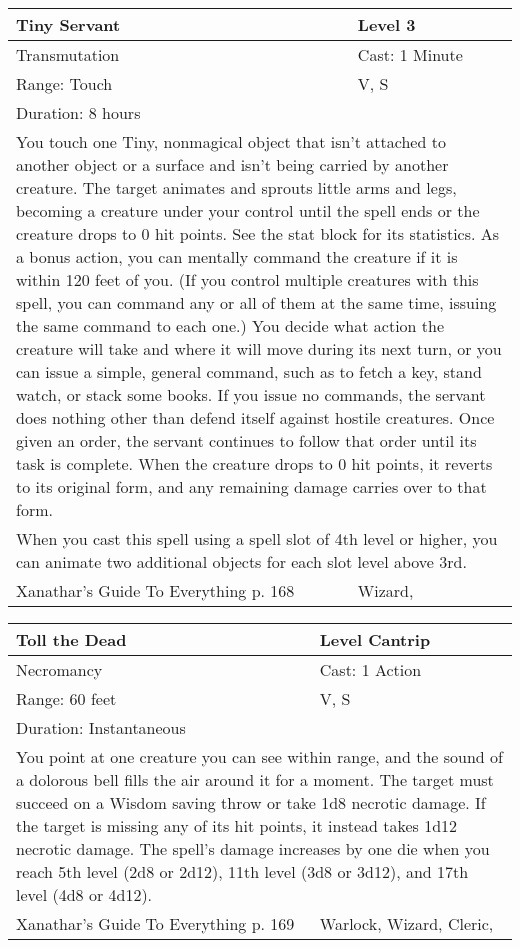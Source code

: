 \documentclass[11pt]{report}
\begin{document}
\begin{table}[H]
	\begin{tabular}{||p{6cm}|p{6cm}||}
		\hline\hline
		\bf{Tiny Servant} & Level 3\\ \hline
		Transmutation & Cast: 1 Minute\\ \hline
		Range: Touch & V, S\\ \hline
		Duration: 8 hours & \\ \hline
		\multicolumn{2}{||p{12cm}||}{You touch one Tiny, nonmagical object that isn’t attached to another object or a surface and isn’t being carried by another creature. The target animates and sprouts little arms and legs, becoming a creature under your control until the spell ends or the creature drops to 0 hit points. See the stat block for its statistics.
As a bonus action, you can mentally command the creature if it is within 120 feet of you. (If you control multiple creatures with this spell, you can command any or all of them at the same time, issuing the same command to each one.) You decide what action the creature will take and where it will move during its next turn, or you can issue a simple, general command, such as to fetch a key, stand watch, or stack some books. If you issue no commands, the servant does nothing other than defend itself against hostile creatures. Once given an order, the servant continues to follow that order until its task is complete.
When the creature drops to 0 hit points, it reverts to its original form, and any remaining damage carries over to that form.}\\ \hline
		\multicolumn{2}{||p{12cm}||}{When you cast this spell using a spell slot of 4th level or higher, you can animate two additional objects for each slot level above 3rd.}\\ \hline
Xanathar's Guide To Everything p. 168 & Wizard, \\ \hline\hline
	\end{tabular}
\end{table}

\begin{table}[H]
	\begin{tabular}{||p{6cm}|p{6cm}||}
		\hline\hline
		\bf{Toll the Dead} & Level Cantrip\\ \hline
		Necromancy & Cast: 1 Action\\ \hline
		Range: 60 feet & V, S\\ \hline
		Duration: Instantaneous & \\ \hline
		\multicolumn{2}{||p{12cm}||}{You point at one creature you can see within range, and the sound of a dolorous bell fills the air around it for a moment. The target must succeed on a Wisdom saving throw or take 1d8 necrotic damage. If the target is missing any of its hit points, it instead takes 1d12 necrotic damage.
The spell’s damage increases by one die when you reach 5th level (2d8 or 2d12), 11th level (3d8 or 3d12), and 17th level (4d8 or 4d12).}\\ \hline
Xanathar's Guide To Everything p. 169 & Warlock, Wizard, Cleric, \\ \hline\hline
	\end{tabular}
\end{table}
\end{document}
